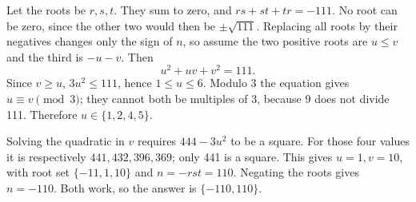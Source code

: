 Let the roots be $r,s,t$. They sum to zero, and $rs+st+tr=-111$. No root can be zero, since the other two would then be $\pm\sqrt{111}$. Replacing all roots by their negatives changes only the sign of $n$, so assume the two positive roots are $u\le v$ and the third is $-u-v$. Then
\[u^2+uv+v^2=111.\]
Since $v\ge u$, $3u^2\le111$, hence $1\le u\le6$. Modulo 3 the equation gives $u\equiv v\pmod3$; they cannot both be multiples of 3, because 9 does not divide 111. Therefore $u\in\{1,2,4,5\}$.

Solving the quadratic in $v$ requires $444-3u^2$ to be a square. For those four values it is respectively $441,432,396,369$; only 441 is a square. This gives $u=1,v=10$, with root set $\{-11,1,10\}$ and $n=-rst=110$. Negating the roots gives $n=-110$. Both work, so the answer is $\boxed{\{-110,110\}}$.

